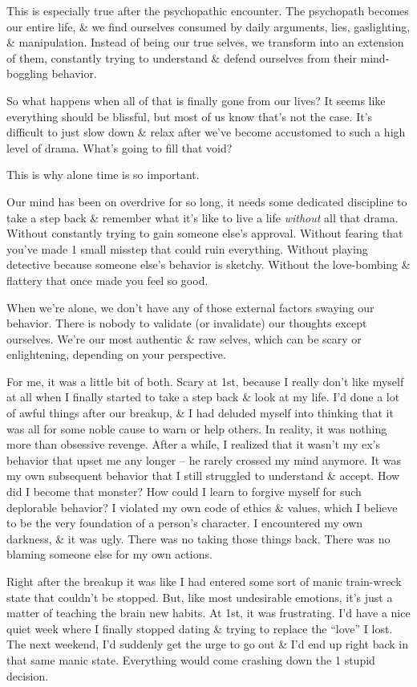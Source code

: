 \documentclass{article}
\numberwithin{equation}{section}
\begin{document}
This is especially true after the psychopathic encounter. The psychopath becomes our entire life, \& we find ourselves consumed by daily arguments, lies, gaslighting, \& manipulation. Instead of being our true selves, we transform into an extension of them, constantly trying to understand \& defend ourselves from their mind-boggling behavior.

So what happens when all of that is finally gone from our lives? It seems like everything should be blissful, but most of us know that's not the case. It's difficult to just slow down \& relax after we've become accustomed to such a high level of drama. What's going to fill that void?

This is why alone time is so important.

Our mind has been on overdrive for so long, it needs some dedicated discipline to take a step back \& remember what it's like to live a life \textit{without} all that drama. Without constantly trying to gain someone else's approval. Without fearing that you've made 1 small misstep that could ruin everything. Without playing detective because someone else's behavior is sketchy. Without the love-bombing \& flattery that once made you feel so good.

When we're alone, we don't have any of those external factors swaying our behavior. There is nobody to validate (or invalidate) our thoughts except ourselves. We're our most authentic \& raw selves, which can be scary or enlightening, depending on your perspective.

For me, it was a little bit of both. Scary at 1st, because I really don't like myself at all when I finally started to take a step back \& look at my life. I'd done a lot of awful things after our breakup, \& I had deluded myself into thinking that it was all for some noble cause to warn or help others. In reality, it was nothing more than obsessive revenge. After a while, I realized that it wasn't my ex's behavior that upset me any longer -- he rarely crossed my mind anymore. It was my own subsequent behavior that I still struggled to understand \& accept. How did I become that monster? How could I learn to forgive myself for such deplorable behavior? I violated my own code of ethics \& values, which I believe to be the very foundation of a person's character. I encountered my own darkness, \& it was ugly. There was no taking those things back. There was no blaming someone else for my own actions.

Right after the breakup it was like I had entered some sort of manic train-wreck state that couldn't be stopped. But, like most undesirable emotions, it's just a matter of teaching the brain new habits. At 1st, it was frustrating. I'd have a nice quiet week where I finally stopped dating \& trying to replace the ``love'' I lost. The next weekend, I'd suddenly get the urge to go out \& I'd end up right back in that same manic state. Everything would come crashing down the 1 stupid decision.
\end{document}
